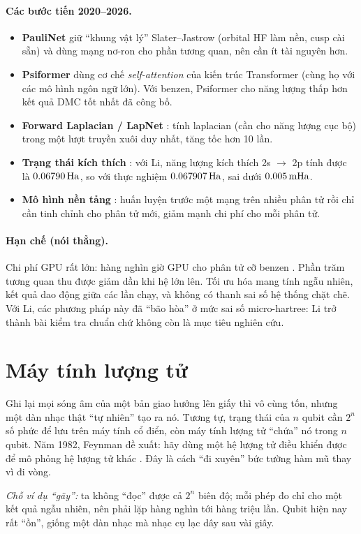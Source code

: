 \paragraph{Các bước tiến 2020--2026.}
\begin{itemize}
\item \textbf{PauliNet} \cite{Hermann2020} giữ ``khung vật lý'' Slater--Jastrow (orbital HF làm nền, cusp cài sẵn) và dùng mạng nơ-ron cho phần tương quan, nên cần ít tài nguyên hơn.
\item \textbf{Psiformer} \cite{vonGlehn2023} dùng cơ chế \emph{self-attention} của kiến trúc Transformer (cùng họ với các mô hình ngôn ngữ lớn). Với benzen, Psiformer cho năng lượng thấp hơn kết quả DMC tốt nhất đã công bố.
\item \textbf{Forward Laplacian / LapNet} \cite{LiLapNet2024}: tính laplacian (cần cho năng lượng cục bộ) trong một lượt truyền xuôi duy nhất, tăng tốc hơn 10 lần.
\item \textbf{Trạng thái kích thích} \cite{Pfau2024}: với Li, năng lượng kích thích 2s $\to$ 2p tính được là $0.06790\,\mathrm{Ha}$, so với thực nghiệm $0.067907\,\mathrm{Ha}$, sai dưới $0.005\,\mathrm{mHa}$.
\item \textbf{Mô hình nền tảng} \cite{Scherbela2024}: huấn luyện trước một mạng trên nhiều phân tử rồi chỉ cần tinh chỉnh cho phân tử mới, giảm mạnh chi phí cho mỗi phân tử.
\end{itemize}

\paragraph{Hạn chế (nói thẳng).}
Chi phí GPU rất lớn: hàng nghìn giờ GPU cho phân tử cỡ benzen \cite{vonGlehn2023}. Phần trăm tương quan thu được giảm dần khi hệ lớn lên. Tối ưu hóa mang tính ngẫu nhiên, kết quả dao động giữa các lần chạy, và không có thanh sai số hệ thống chặt chẽ. Với Li, các phương pháp này đã ``bão hòa'' ở mức sai số micro-hartree: Li trở thành bài kiểm tra chuẩn chứ không còn là mục tiêu nghiên cứu.

\section{Máy tính lượng tử}

\begin{eli5}
Ghi lại mọi sóng âm của một bản giao hưởng lên giấy thì vô cùng tốn, nhưng một dàn nhạc thật ``tự nhiên'' tạo ra nó. Tương tự, trạng thái của $n$ qubit cần $2^n$ số phức để lưu trên máy tính cổ điển, còn máy tính lượng tử ``chứa'' nó trong $n$ qubit. Năm 1982, Feynman đề xuất: hãy dùng một hệ lượng tử điều khiển được để mô phỏng hệ lượng tử khác \cite{Feynman1982}. Đây là cách ``đi xuyên'' bức tường hàm mũ thay vì đi vòng.

\emph{Chỗ ví dụ ``gãy'':} ta không ``đọc'' được cả $2^n$ biên độ; mỗi phép đo chỉ cho một kết quả ngẫu nhiên, nên phải lặp hàng nghìn tới hàng triệu lần. Qubit hiện nay rất ``ồn'', giống một dàn nhạc mà nhạc cụ lạc dây sau vài giây.
\end{eli5}

